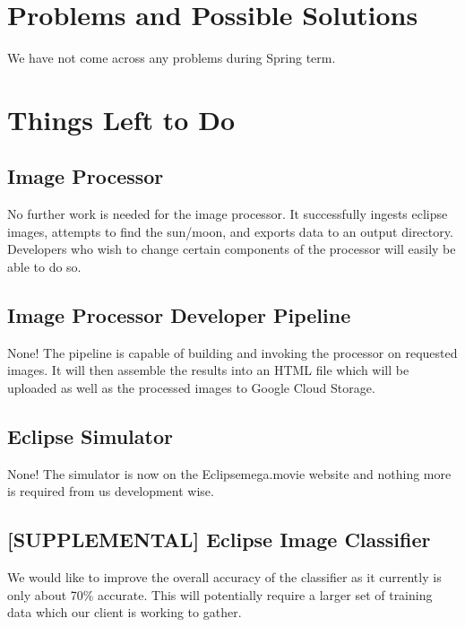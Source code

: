\documentclass[10pt, onecolumn, draftclsnofoot, letterpaper, compsoc]{IEEEtran}
\begin{document}
\section{Problems and Possible Solutions}

We have not come across any problems during Spring term.

\section{Things Left to Do}

\subsection{Image Processor}

No further work is needed for the image processor. It successfully ingests
eclipse images, attempts to find the sun/moon, and exports data to an output
directory. Developers who wish to change certain components of the
processor will easily be able to do so. \\

\subsection{Image Processor Developer Pipeline}

None! The pipeline is capable of building and invoking the processor on requested
images. It will then assemble the results into an HTML file which will be uploaded
as well as the processed images to Google Cloud Storage. \\

\subsection{Eclipse Simulator}

None! The simulator is now on the Eclipsemega.movie website and nothing more
is required from us development wise. \\

\subsection{[SUPPLEMENTAL] Eclipse Image Classifier}

We would like to improve the overall accuracy of the classifier as it currently
is only about 70\% accurate. This will potentially require a larger
set of training data which our client is working to gather. \\
\end{document}

